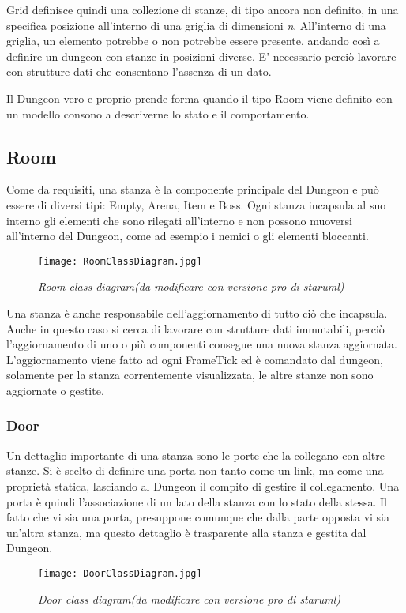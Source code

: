 Grid definisce quindi una collezione di stanze, di tipo ancora non definito, in una specifica posizione all'interno di una griglia di dimensioni \textit{n}. All'interno di una griglia, un elemento potrebbe o non potrebbe essere presente, andando così a definire un dungeon con stanze in posizioni diverse. E' necessario perciò lavorare con strutture dati che consentano l'assenza di un dato.

Il Dungeon vero e proprio prende forma quando il tipo Room viene definito con un modello consono a descriverne lo stato e il comportamento. 

\subsection{Room}
Come da requisiti, una stanza è la componente principale del Dungeon e può essere di diversi tipi: Empty, Arena, Item e Boss. 
Ogni stanza incapsula al suo interno gli elementi che sono rilegati all'interno e non possono muoversi all'interno del Dungeon, come ad esempio i nemici o gli elementi bloccanti. 

\begin{figure}[!hbt]
    \centering
    \texttt{[image: RoomClassDiagram.jpg]}
    \caption{\textit{Room class diagram(da modificare con versione pro di staruml)}} 
\end{figure}

Una stanza è anche responsabile dell'aggiornamento di tutto ciò che incapsula. Anche in questo caso si cerca di lavorare con strutture dati immutabili, perciò l'aggiornamento di uno o più componenti consegue una nuova stanza aggiornata. 
L'aggiornamento viene fatto ad ogni FrameTick ed è comandato dal dungeon, solamente per la stanza correntemente visualizzata, le altre stanze non sono aggiornate o gestite.  

\subsubsection{Door}
Un dettaglio importante di una stanza sono le porte che la collegano con altre stanze. Si è scelto di definire una porta non tanto come un link, ma come una proprietà statica, lasciando al Dungeon il compito di gestire il collegamento. 
Una porta è quindi l'associazione di un lato della stanza con lo stato della stessa. Il fatto che vi sia una porta, presuppone comunque che dalla parte opposta vi sia un'altra stanza, ma questo dettaglio è trasparente alla stanza e gestita dal Dungeon. 
\begin{figure}[!hbt]
    \centering
    \texttt{[image: DoorClassDiagram.jpg]}
    \caption{\textit{Door class diagram(da modificare con versione pro di staruml)}} 
\end{figure}

